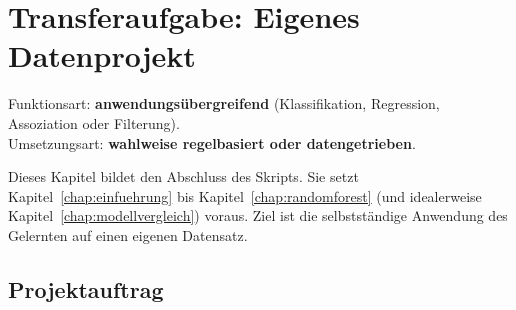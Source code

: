 \chapter{Transferaufgabe: Eigenes Datenprojekt}
\label{chap:transfer}

\begin{myremark}
Funktionsart: \textbf{anwendungsübergreifend} (Klassifikation, Regression, Assoziation oder Filterung). \\
Umsetzungsart: \textbf{wahlweise regelbasiert oder datengetrieben}.
\end{myremark}

\begin{myremark}
Dieses Kapitel bildet den Abschluss des Skripts.
Sie setzt Kapitel~\cref{chap:einfuehrung} bis Kapitel~\cref{chap:randomforest} (und idealerweise Kapitel~\cref{chap:modellvergleich}) voraus.
Ziel ist die selbstständige Anwendung des Gelernten auf einen eigenen Datensatz.
\end{myremark}

\section{Projektauftrag}

